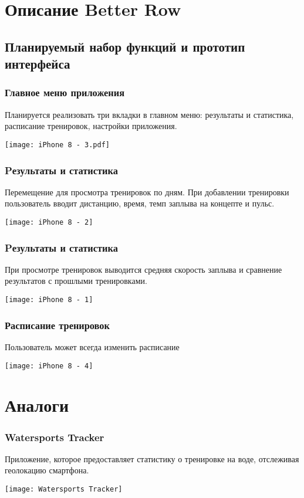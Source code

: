 \documentclass[10pt,utf8,presentation,notheorems,xcolor=dvipsnames,compress]{beamer}
\begin{document}
\section{Описание Better Row}

\subsection{Планируемый набор функций и прототип интерфейса}
\begin{frame}
\frametitle{Главное меню приложения}
Планируется реализовать три вкладки в главном меню: результаты и статистика, расписание тренировок, настройки приложения.
\begin{center}
\texttt{[image: iPhone 8 - 3.pdf]}%
\end{center}
\end{frame}

\begin{frame}
\frametitle{Pезультаты и статистика}
Перемещение для просмотра тренировок по дням. При добавлении тренировки пользователь вводит дистанцию, время, темп заплыва на концепте и пульс.
\begin{center}
\texttt{[image: iPhone 8 - 2]}%
\end{center}
\end{frame}

\begin{frame}
\frametitle{Pезультаты и статистика}
При просмотре тренировок выводится средняя скорость заплыва и сравнение результатов с прошлыми тренировками.
\begin{center}
\texttt{[image: iPhone 8 - 1]}%
\end{center}
\end{frame}

\begin{frame}
\frametitle{Расписание тренировок}
Пользователь может всегда изменить расписание
\begin{center}
\texttt{[image: iPhone 8 - 4]}%
\end{center}
\end{frame}


\section{Аналоги}
\begin{frame}
\frametitle{Watersports Tracker}
Приложение, которое предоставляет статистику о тренировке на воде, отслеживая геолокацию смартфона.
\begin{center}
\texttt{[image: Watersports Tracker]}%
\end{center}
\end{frame}
\end{document}
